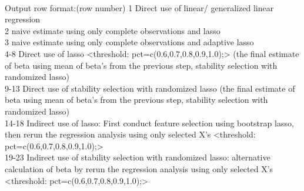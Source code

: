 \documentclass[a4paper]{article}
\begin{document}
\\
Output row format:(row number)
1 Direct use of linear/ generalized linear regression \\
2 naive estimate using only complete observations and lasso \\
3 naive estimate using only complete observations and adaptive lasso  \\
4-8  Direct use of lasso <threshold: pct=c(0.6,0.7,0.8,0.9,1.0);>
(the final estimate of beta using mean of beta's from the previous step, stability selection with randomized lasso) \\
9-13 Direct use of stability selection with randomized lasso  
(the final estimate of beta using mean of beta's from the previous step, stability selection with randomized lasso) \\
14-18 Indirect use of lasso:  First conduct feature selection using bootstrap lasso, then rerun the regression analysis using only selected X's <threshold: pct=c(0.6,0.7,0.8,0.9,1.0);> \\
19-23 Indirect use of stability selection with randomized lasso: alternative calculation of beta by rerun the regression analysis using only selected X's <threshold: pct=c(0.6,0.7,0.8,0.9,1.0);>
\\
\end{document}
